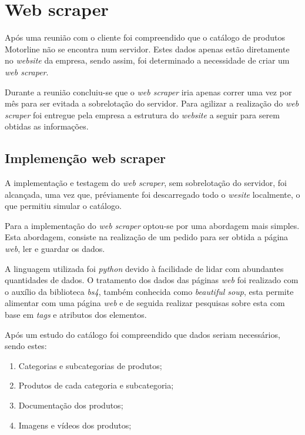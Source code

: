 

\section{Web scraper}

Após uma reunião com o cliente foi compreendido que o catálogo de produtos Motorline não se encontra num servidor. Estes dados apenas estão diretamente no \textit{website} da empresa, sendo assim, foi determinado a necessidade de criar um \textit{web scraper}.

Durante a reunião concluiu-se que o \textit{web scraper} iria apenas correr uma vez por mês para ser evitada a sobrelotação do servidor. Para agilizar a realização do \textit{web scraper} foi entregue pela empresa a estrutura do \textit{website} a seguir para serem obtidas as informações.

\subsection{Implemenção web scraper}
A implementação e testagem do \textit{web scraper}, sem sobrelotação do servidor, foi alcançada, uma vez que, préviamente foi descarregado todo o \textit{wesite} localmente, o que permitiu simular o catálogo.

Para a implementação do \textit{web scraper} optou-se por uma abordagem mais simples. Esta abordagem, consiste na realização de um pedido para ser obtida a página \textit{web}, ler e guardar os dados.

A linguagem utilizada foi \textit{python} devido à facilidade de lidar com abundantes quantidades de dados. O tratamento dos dados das páginas \textit{web} foi realizado com o auxílio da biblioteca \textit{bs4}, também conhecida como \textit{beautiful soup}, esta permite alimentar com uma página \textit{web} e de seguida realizar pesquisas sobre esta com base em \textit{tags} e atributos dos elementos.

Após um estudo do catálogo foi compreendido que dados seriam necessários, sendo estes:
\begin{enumerate}
  \item Categorias e subcategorias de produtos;
  \item Produtos de cada categoria e subcategoria;
  \item Documentação dos produtos;
  \item Imagens e vídeos dos produtos;
\end{enumerate}

